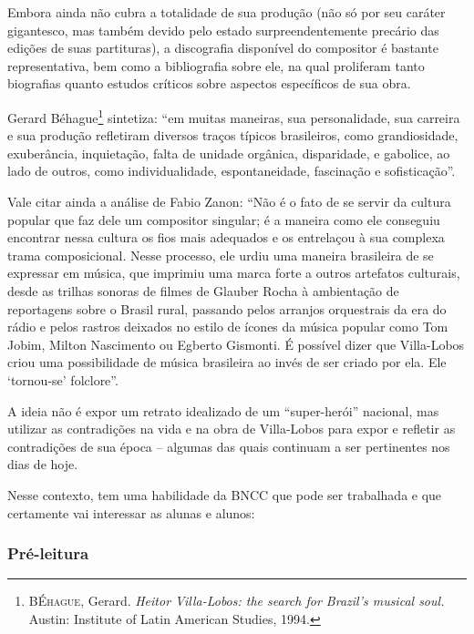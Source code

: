 \documentclass[11pt]{extarticle}
\begin{document}

Embora ainda não cubra a totalidade de sua produção (não só por seu
caráter gigantesco, mas também devido pelo estado surpreendentemente
precário das edições de suas partituras), a discografia disponível do
compositor é bastante representativa, bem como a bibliografia sobre ele,
na qual proliferam tanto biografias quanto estudos críticos sobre
aspectos específicos de sua obra.

Gerard Béhague\footnote{BÉ\textsc{hague}, Gerard. \emph{Heitor Villa-Lobos: the
  search for Brazil's musical soul.} Austin: Institute of Latin American
  Studies, 1994.} sintetiza: ``em muitas maneiras, sua personalidade,
sua carreira e sua produção refletiram diversos traços típicos
brasileiros, como grandiosidade, exuberância, inquietação, falta de
unidade orgânica, disparidade, e gabolice, ao lado de outros, como
individualidade, espontaneidade, fascinação e sofisticação''.

Vale citar ainda a análise de Fabio Zanon: ``Não é o fato de se servir
da cultura popular que faz dele um compositor singular; é a maneira como
ele conseguiu encontrar nessa cultura os fios mais adequados e os
entrelaçou à sua complexa trama composicional. Nesse processo, ele urdiu
uma maneira brasileira de se expressar em música, que imprimiu uma marca
forte a outros artefatos culturais, desde as trilhas sonoras de filmes
de Glauber Rocha à ambientação de reportagens sobre o Brasil rural,
passando pelos arranjos orquestrais da era do rádio e pelos rastros
deixados no estilo de ícones da música popular como Tom Jobim, Milton
Nascimento ou Egberto Gismonti. É possível dizer que Villa-Lobos criou
uma possibilidade de música brasileira ao invés de ser criado por ela.
Ele `tornou-se' folclore''.

A ideia não é expor um retrato idealizado de um ``super-herói''
nacional, mas utilizar as contradições na vida e na obra de Villa-Lobos
para expor e refletir as contradições de sua época -- algumas das quais
continuam a ser pertinentes nos dias de hoje.

Nesse contexto, tem uma habilidade da BNCC que pode ser trabalhada e que certamente vai interessar as alunas e alunos:

\subsubsection{Pré-leitura}
\end{document}
